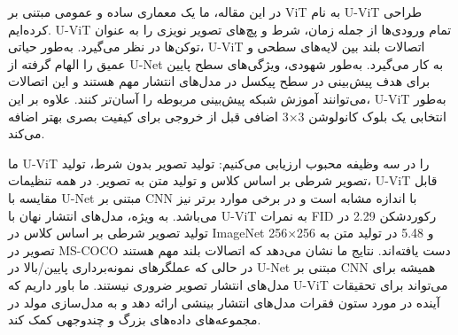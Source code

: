 در این مقاله، ما یک معماری ساده و عمومی مبتنی بر ViT به نام U-ViT طراحی کرده‌ایم. U-ViT تمام ورودی‌ها از جمله زمان، شرط و پچ‌های تصویر نویزی را به عنوان توکن‌ها در نظر می‌گیرد. به‌طور حیاتی، U-ViT اتصالات بلند بین لایه‌های سطحی و عمیق را الهام گرفته از U-Net به کار می‌گیرد. به‌طور شهودی، ویژگی‌های سطح پایین برای هدف پیش‌بینی در سطح پیکسل در مدل‌های انتشار مهم هستند و این اتصالات می‌توانند آموزش شبکه پیش‌بینی مربوطه را آسان‌تر کنند. علاوه بر این، U-ViT به‌طور انتخابی یک بلوک کانولوشن 3×3 اضافی قبل از خروجی برای کیفیت بصری بهتر اضافه می‌کند.

ما U-ViT را در سه وظیفه محبوب ارزیابی می‌کنیم: تولید تصویر بدون شرط، تولید تصویر شرطی بر اساس کلاس و تولید متن به تصویر. در همه تنظیمات، U-ViT قابل مقایسه با U-Net مبتنی بر CNN با اندازه مشابه است و در برخی موارد برتر نیز می‌باشد. به ویژه، مدل‌های انتشار نهان با U-ViT به نمرات FID رکوردشکن 2.29 در تولید تصویر شرطی بر اساس کلاس در ImageNet 256×256 و 5.48 در تولید متن به تصویر در MS-COCO دست یافته‌اند. نتایج ما نشان می‌دهد که اتصالات بلند مهم هستند در حالی که عملگرهای نمونه‌برداری پایین/بالا در U-Net مبتنی بر CNN همیشه برای مدل‌های انتشار تصویر ضروری نیستند. ما باور داریم که U-ViT می‌تواند برای تحقیقات آینده در مورد ستون فقرات مدل‌های انتشار بینشی ارائه دهد و به مدل‌سازی مولد در مجموعه‌های داده‌های بزرگ و چندوجهی کمک کند.








































